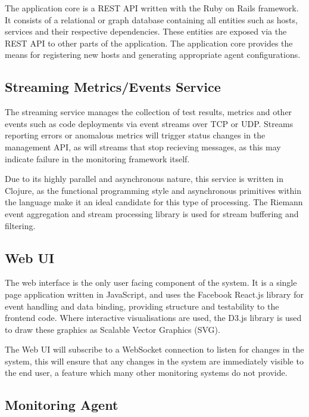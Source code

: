 \documentclass{cshonours}
\begin{document}
The application core is a REST API written with the Ruby on Rails framework. It consists of a relational or graph database containing all entities such as hosts, services and their respective dependencies. These entities are exposed via the REST API to other parts of the application. The application core provides the means for registering new hosts and generating appropriate agent configurations.

\subsection{Streaming Metrics/Events Service}

The streaming service manages the collection of test results, metrics and other events such as code deployments via event streams over TCP or UDP. Streams reporting errors or anomalous metrics will trigger status changes in the management API, as will streams that stop recieving messages, as this may indicate failure in the monitoring framework itself.

Due to its highly parallel and asynchronous nature, this service is written in Clojure, as the functional programming style and asynchronous primitives within the language make it an ideal candidate for this type of processing. The Riemann event aggregation and stream processing library is used for stream buffering and filtering.

\subsection{Web UI}

The web interface is the only user facing component of the system. It is a single page application written in JavaScript, and uses the Facebook React.js library for event handling and data binding, providing structure and testability to the frontend code. Where interactive visualisations are used, the D3.js library is used to draw these graphics as Scalable Vector Graphics (SVG).

The Web UI will subscribe to a WebSocket connection to listen for changes in the system, this will ensure that any changes in the system are immediately visible to the end user, a feature which many other monitoring systems do not provide.

\subsection{Monitoring Agent}
\end{document}
